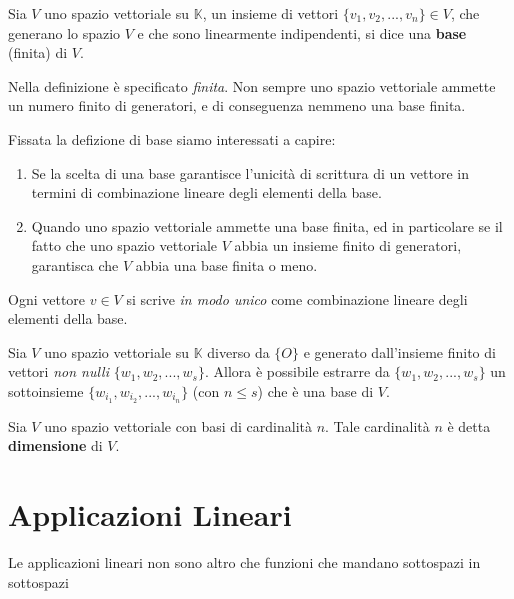 \begin{defn}
	Sia $V$ uno spazio vettoriale su $\mathbb{K}$, un insieme di vettori
	$\{v_1, v_2, ..., v_n\} \in V$, che generano lo spazio $V$ e che sono
	linearmente indipendenti, si dice una \textbf{base} (finita) di $V$.
\end{defn}

\begin{observation}
	Nella definizione \`e specificato \emph{finita}. Non sempre uno
	spazio vettoriale ammette un numero finito di generatori, e di
	conseguenza nemmeno una base finita.
\end{observation}

Fissata la defizione di base siamo interessati a capire:
\begin{enumerate}
	\item
	      Se la scelta di una base garantisce l'unicit\`a di scrittura di un vettore
	      in termini di combinazione lineare degli elementi della base.
	\item
	      Quando uno spazio vettoriale ammette una base finita, ed in
	      particolare se il fatto che uno spazio vettoriale $V$ abbia un
	      insieme finito di generatori, garantisca che $V$ abbia una
	      base finita o meno.
\end{enumerate}

\begin{proposition}
	Ogni vettore $v \in V$ si scrive \emph{in modo unico} come
	combinazione lineare degli elementi della base.
\end{proposition}

\begin{theorem}
	Sia $V$ uno spazio vettoriale su $\mathbb{K}$ diverso da $\{O\}$
	e generato dall'insieme finito di vettori \emph{non nulli}
	$\{w_1, w_2, ..., w_s\}$. Allora \`e possibile estrarre da
	$\{w_1, w_2, ..., w_s\}$ un sottoinsieme
	$\{w_{i_1}, w_{i_2}, ..., w_{i_n}\}$ (con $n \leq s$) che \`e
	una base di $V$.
\end{theorem}

\begin{defn}
	Sia $V$  uno spazio vettoriale con basi di cardinalit\`a $n$.
	Tale cardinalit\`a $n$ \`e detta \textbf{dimensione} di $V$.
\end{defn}

\section{Applicazioni Lineari}
Le applicazioni lineari non sono altro che funzioni che mandano
sottospazi in sottospazi

